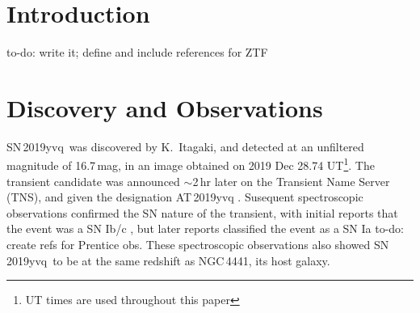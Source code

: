 \documentclass[twocolumn]{aastex63}
\newcommand{\todo}[1]{{\color{magenta} to-do: {#1}}}
\newcommand{\sn}{SN\,2019yvq}
\begin{document}

\author{ZTF}

\author{et al.}


\begin{abstract}

\todo{Write the abstract}

\end{abstract}

\keywords{}

\section{Introduction} \label{sec:intro}

\todo{write it; define and include references for ZTF}

\section{Discovery and Observations}\label{sec:obs}

\sn\ was discovered by K.~Itagaki, and detected at an unfiltered magnitude of
16.7\,mag, in an image obtained on 2019 Dec 28.74 UT\footnote{UT times are
used throughout this paper}. The transient candidate was announced
$\sim$2\,hr later on the Transient Name Server (TNS), and given the
designation AT\,2019yvq \citep{Itagaki19}. Susequent spectroscopic
observations confirmed the SN nature of the transient, with initial reports
that the event was a SN Ib/c \citep{Kawabata20}, but later reports classified
the event as a SN Ia \todo{create refs for Prentice obs}. These spectroscopic
observations also showed \sn\ to be at the same redshift as NGC\,4441, its
host galaxy.
\end{document}
